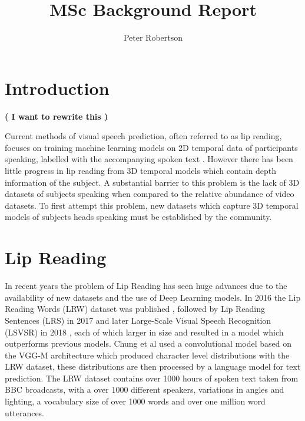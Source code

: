 \documentclass[12pt]{report}
\title{MSc Background Report}
\author{Peter Robertson}
\date{}
\begin{document}
\maketitle

\setcounter{page}{0}
\clearpage{\pagestyle{empty}\cleardoublepage}

\tableofcontents 
\clearpage{\pagestyle{empty}\cleardoublepage}


\setcounter{page}{1}

\chapter{Introduction}

\textbf{( I want to rewrite this )}

Current methods of visual speech prediction, often referred to as lip reading, focuses on training machine learning models on 2D temporal data of participants speaking, labelled with the accompanying spoken text \cite{Chung2016, Assael2016, Chung2017, Shillingford2018}.
However there has been little progress in lip reading from 3D temporal models which contain depth information of the subject.
A substantial barrier to this problem is the lack of 3D datasets of subjects speaking when compared to the relative abundance of video datasets.
To first attempt this problem, new datasets which capture 3D temporal models of subjects heads speaking must be established by the community.

\chapter{Lip Reading}
In recent years the problem of Lip Reading has seen huge advances due to the availability of new datasets and the use of Deep Learning models.
In 2016 the Lip Reading Words (LRW) dataset was published \cite{Chung2016}, followed by Lip Reading Sentences (LRS) in 2017 \cite{Chung2017} and later Large-Scale Visual Speech Recognition (LSVSR) in 2018 \cite{Shillingford2018}, each of which larger in size and resulted in a model which outperforms previous models.
Chung et al \cite{Chung2016} used a convolutional model based on the VGG-M architecture which produced character level distributions with the LRW dataset, these distributions are then processed by a language model for text prediction.
The LRW dataset contains over 1000 hours of spoken text taken from BBC broadcasts, with a over 1000 different speakers, variations in angles and lighting, a vocabulary size of over 1000 words and over one million word utterances.
\end{document}
